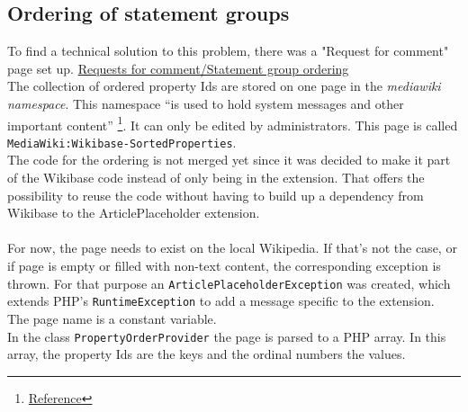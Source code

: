 \subsection{Ordering of statement groups}

To find a technical solution to this problem, there was a "Request for comment" page set up. \href{https://www.mediawiki.org/wiki/Requests_for_comment/Statement_group_ordering}{Requests for comment/Statement group ordering} \\

The collection of ordered property Ids are stored on one page in the \textit{mediawiki namespace}. This namespace ``is used to hold system messages and other important content'' \footnote{\href{https://www.mediawiki.org/wiki/Help:Namespaces\#MediaWiki}{Reference}}. It can only be edited by administrators. This page is called \texttt{MediaWiki:Wikibase-SortedProperties}. \\
The code for the ordering is not merged yet since it was decided to make it part of the Wikibase code instead of only being in the extension. That offers the possibility to reuse the code without having to build up a dependency from Wikibase to the ArticlePlaceholder extension. \\
\\
For now, the page needs to exist on the local Wikipedia. If that's not the case, or if page is empty or filled with non-text content, the corresponding exception is thrown. For that purpose an \texttt{ArticlePlaceholderException} was created, which extends PHP's \texttt{RuntimeException} to add a message specific to the extension.\\
The page name is a constant variable. \\
In the class \texttt{PropertyOrderProvider} the page is parsed to a PHP array. In this array, the property Ids are the keys and the ordinal numbers the values. \\

